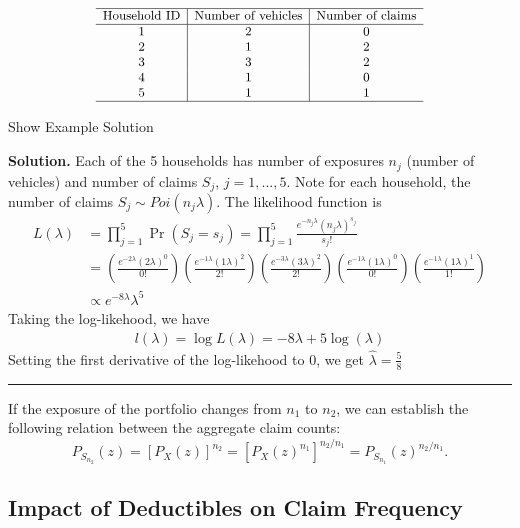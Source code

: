 \documentclass[]{book}
\theoremstyle{definition}
\theoremstyle{definition}
\theoremstyle{definition}
\theoremstyle{remark}
\begin{document}
\[
{\small 
\begin{matrix}
\begin{array}{c|c|c}
  \hline
  \text{Household ID} & \text{Number of vehicles} & \text{Number of claims} \\
  \hline
  1 & 2 & 0 \\
  2 & 1 & 2 \\
  3 & 3 & 2 \\
  4 & 1 & 0 \\
  5 & 1 & 1 \\
  \hline
\end{array}
\end{matrix}
}
\]

Show Example Solution

\hypertarget{toggleExampleAggLoss.5.1}{}
\textbf{Solution.} Each of the 5 households has number of exposures
\(n_j\) (number of vehicles) and number of claims \(S_j\),
\(j=1,...,5\). Note for each household, the number of claims
\(S_j \sim Poi (n_j \lambda)\). The likelihood function is\\
\[\begin{aligned}
L(\lambda) &= \prod_{j=1}^5 \Pr(S_j=s_j) = \prod_{j=1}^5 \frac{e^{-n_j\lambda} (n_j \lambda)^{s_j}}{s_j!} \\
&= \left(\frac{e^{-2\lambda} (2 \lambda)^{0}}{0!} \right)
\left(\frac{e^{-1\lambda} (1 \lambda)^{2}}{2!} \right)
\left(\frac{e^{-3\lambda} (3 \lambda)^{2}}{2!} \right)
\left(\frac{e^{-1\lambda} (1 \lambda)^{0}}{0!} \right)
\left(\frac{e^{-1\lambda} (1 \lambda)^{1}}{1!} \right) \\
&\propto e^{-8\lambda} \lambda^5
\end{aligned}\] Taking the log-likehood, we have \[\begin{aligned}
l(\lambda) = \log L(\lambda) = -8\lambda + 5\log(\lambda)
\end{aligned}\] Setting the first derivative of the log-likehood to 0,
we get \(\hat{\lambda} = \frac{5}{8}\)

\begin{center}\rule{0.5\linewidth}{\linethickness}\end{center}

If the exposure of the portfolio changes from \(n_1\) to \(n_2\), we can
establish the following relation between the aggregate claim counts:
\[P_{S_{n_2}}(z)=[P_X(z)]^{n_2}=[P_X(z)^{n_1}]^{n_2/n_1}=P_{S_{n_1}}(z)^{n_2/n_1}.\]

\subsection{Impact of Deductibles on Claim
Frequency}\label{S:MS:DedImpactClmFreq}
\end{document}
